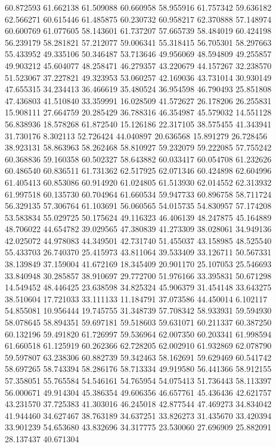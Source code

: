 60.872593
61.662138
61.509088
60.660958
58.955916
61.757342
59.636182
62.566271
60.615446
61.485875
60.230732
60.958217
62.370888
57.148974
60.600769
61.077605
58.143601
61.737207
57.665739
58.484019
60.424198
56.239179
58.281821
57.212077
59.006341
55.318415
56.705301
58.297663
55.433952
49.335106
50.346487
53.713646
49.956069
48.594809
49.255857
49.903212
45.604077
48.258471
46.279357
43.220679
44.157267
32.238570
51.523067
37.227821
49.323953
53.060257
42.169036
43.731014
30.930149
47.655315
34.234413
36.466619
35.480524
36.954598
46.790493
25.851808
47.436803
41.510840
33.359991
16.028509
41.572627
26.178206
26.255831
15.908111
27.664759
20.285429
36.788316
46.354987
45.579032
14.551128
56.838936
18.578268
61.872540
15.126186
22.317105
38.575455
41.343941
31.730176
8.302113
52.726424
44.040897
20.636568
15.891279
26.728456
38.923131
58.863963
58.262468
58.810927
59.232079
59.222085
57.755242
60.368836
59.160358
60.502327
58.643882
60.033417
60.054708
61.232626
60.486540
60.836511
61.731362
62.517925
62.071346
60.424898
62.604996
61.405413
60.853086
60.914920
61.024805
61.513930
62.014552
62.313932
61.997518
60.135730
60.704964
61.660534
59.947733
60.896758
58.711724
56.329135
57.306764
61.103691
56.060565
54.015735
54.830957
57.174208
53.583834
55.029725
50.175624
49.116323
46.406139
48.247875
45.164889
48.706022
44.654782
39.029565
47.380839
41.273309
38.028061
34.949136
42.025072
44.978083
44.349501
42.731740
51.455037
43.158985
48.525540
55.433703
26.740370
25.415973
43.811064
39.533409
33.126711
50.567331
38.139849
37.159004
41.672169
18.345409
20.901170
25.107053
25.546693
33.840948
30.285857
38.910697
29.772700
51.976166
33.395831
50.671298
14.549452
48.446425
23.638598
34.825324
45.906379
31.454148
33.643275
38.510604
17.721033
33.111133
11.184791
37.073586
44.450014
6.102117
54.855081
10.956444
19.745755
31.348739
57.708342
58.933931
59.594930
58.078645
58.894351
59.697181
59.518603
59.631071
60.211337
60.387250
60.132196
59.491820
61.726997
59.536964
62.007350
60.203341
61.998594
61.660518
61.125919
60.262366
62.728205
62.002910
61.932869
62.078790
59.597807
63.238306
60.882739
59.342463
58.162691
59.629469
60.541742
58.697265
58.743394
58.286176
58.713334
49.919580
56.441366
58.912155
57.358051
55.765584
54.546161
54.765954
54.075413
51.736443
58.113397
56.000671
49.914304
45.386354
49.606356
46.657761
45.436436
42.621757
43.231570
37.725383
41.303016
46.245018
42.877544
47.469273
34.834042
41.944460
34.627467
38.763189
34.637251
33.826273
31.435670
33.420394
33.901239
54.653680
43.832696
34.317775
23.530060
27.696909
25.882091
28.137437
40.671304

